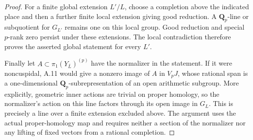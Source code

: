 \begin{proof}
For a finite global extension \(L'/L\), choose a completion above
the indicated place and then a further finite local extension
giving good reduction. A \(\mathbf Q_p\)-line or subquotient for
\(G_{L'}\) remains one on this local group. Good reduction and
special \(p\)-rank zero persist under these extensions. The local
contradiction therefore proves the asserted global statement
for every \(L'\).

Finally let \(A\subset\pi_1(Y_{\bar L})^{(p)}\) have the
normalizer in the statement. If it were noncuspidal, A.11 would
give a nonzero image of \(A\) in \(V_pJ\), whose rational span
is a one-dimensional \(\mathbf Q_p\)-subrepresentation of an open
arithmetic subgroup. More explicitly, geometric inner actions
are trivial on proper homology, so the normalizer's action on
this line factors through its open image in \(G_L\).
This is precisely a line over a finite extension excluded above.
The argument uses the actual proper-homology map and requires
neither a section of the normalizer nor any lifting of fixed
vectors from a rational completion.
\end{proof}
